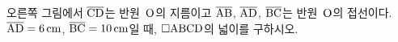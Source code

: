 \noindent\begin{minipage}[t]{0.58\linewidth}\vspace{0pt}\raggedright 오른쪽 그림에서 $\overline{\mathrm{CD}}$는 반원~$\mathrm{O}$의 지름이고 $\overline{\mathrm{AB}}$, $\overline{\mathrm{AD}}$, $\overline{\mathrm{BC}}$는 반원~$\mathrm{O}$의 접선이다. $\overline{\mathrm{AD}}=6\,\mathrm{cm}$, $\overline{\mathrm{BC}}=10\,\mathrm{cm}$일 때, $\square\mathrm{ABCD}$의 넓이를 구하시오.\end{minipage}\hfill\begin{minipage}[t]{0.4\linewidth}\vspace{0pt}\centering \resizebox{\ifdim\width>\linewidth\linewidth\else\width\fi}{!}{}\end{minipage}\par
